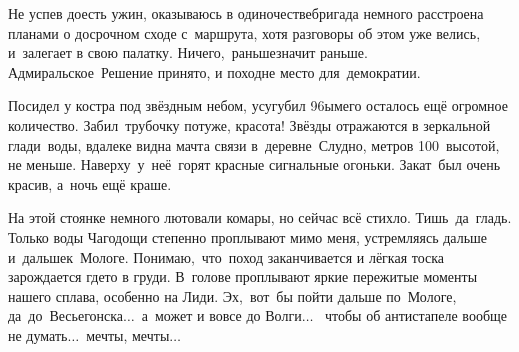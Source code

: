 Не успев доесть ужин, оказываюсь в одиночестве\mdash бригада немного расстроена планами о досрочном сходе с~маршрута, хотя разговоры об этом уже велись, и~залегает в свою палатку. Ничего,~раньше\mdash значит раньше. Адмиральское~Решение принято, и поход\mdash не место для~демократии. 

Посидел у костра под звёздным небом, усугубил 96\sdash ым\mdash его осталось ещё огромное количество. Забил~трубочку потуже, красота! Звёзды отражаются в зеркальной глади~воды, вдалеке видна мачта связи в~деревне~Слудно, метров 100~высотой, не меньше. Наверху~у~неё~горят красные сигнальные огоньки. Закат~был очень красив, а~ночь ещё краше. 

На этой стоянке немного лютовали комары, но сейчас всё стихло. Тишь~да~гладь. Только воды Чагодощи степенно проплывают мимо меня, устремляясь дальше и~дальше\mdash к~Мологе. Понимаю,~что~поход заканчивается и лёгкая тоска зарождается где\sdash то в груди. В~голове проплывают яркие пережитые моменты нашего сплава, особенно на Лиди. 
\newpage 
Эх,~вот~бы пойти дальше по~Мологе, да~до~Весьегонска$\ldots$~а~может и вовсе до Волги$\ldots$~ чтобы об антистапеле вообще не думать$\ldots$~мечты, мечты$\ldots$

\begin{center}
\end{center}
